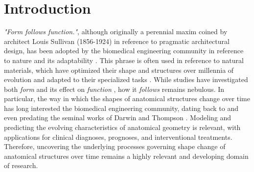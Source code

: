 \section{Introduction}

	\textit{"Form follows function."}, although originally a perennial maxim coined by architect Louis Sullivan (1856-1924) in reference to pragmatic architectural design, has been adopted by the biomedical engineering community in reference to nature and its adaptability \cite{Sull96, RusMotAsh00}. This phrase is often used in reference to natural materials, which have optimized their shape and structures over millennia of evolution and adapted to their specialized tasks \cite{Wegst2014}. While studies have investigated both \textit{form} and its effect on \textit{function} \cite{Libonati2017, Wang2020mnmnmnmnm}, how it \textit{follows} remains nebulous. In particular, the way in which the shapes of anatomical structures change over time has long interested the biomedical engineering community, dating back to and even predating the seminal works of Darwin and Thompson \cite{Darwin2009, Thompson_1992}. Modeling and predicting the evolving characteristics of anatomical geometry is relevant, with applications for clinical diagnoses, prognoses, and interventional treatments. Therefore, uncovering the underlying processes governing shape change of anatomical structures over time remains a highly relevant and developing domain of research. 
			
